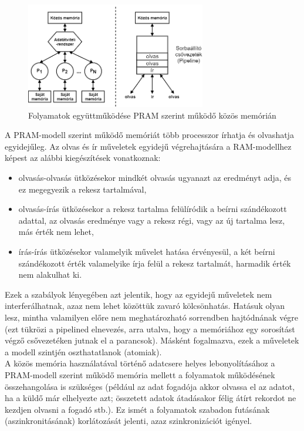 \documentclass[tikz,12pt,margin=0px]{article}
\begin{document}
    \begin{figure}[H]
        \centering
        \includegraphics[width=0.7\textwidth]{img/shared_memory_sync.png}
        \caption{Folyamatok együttműködése PRAM szerint működő közös memórián}
        \label{shared_memory_sync}
    \end{figure}
\newpage
    \noindent A PRAM-modell szerint működő memóriát több processzor írhatja és olvashatja egyidejűleg. Az olvas és ír műveletek egyidejű végrehajtására a RAM-modellhez képest az alábbi kiegészítések vonatkoznak:
    \begin{itemize}
        \item olvasás-olvasás ütközésekor mindkét olvasás ugyanazt az eredményt adja, és ez megegyezik a rekesz tartalmával,

        \item olvasás-írás ütközésekor a rekesz tartalma felülíródik a beírni szándékozott adattal, az olvasás eredménye vagy a rekesz régi, vagy az új tartalma lesz, más érték nem lehet,

        \item írás-írás ütközésekor valamelyik művelet hatása érvényesül, a két beírni szándékozott érték valamelyike írja felül a rekesz tartalmát, harmadik érték nem alakulhat ki.
    \end{itemize}

    \noindent Ezek a szabályok lényegében azt jelentik, hogy az egyidejű műveletek nem interferálhatnak, azaz nem lehet közöttük zavaró kölcsönhatás. Hatásuk olyan lesz, mintha valamilyen előre nem meghatározható sorrendben hajtódnának végre (ezt tükrözi a pipelined elnevezés, arra utalva, hogy a memóriához egy sorosítást végző csővezetéken jutnak el a parancsok). Másként fogalmazva, ezek a műveletek a modell szintjén oszthatatlanok (atomiak).\\

    \noindent A közös memória használatával történő adatcsere helyes lebonyolításához a PRAM-modell szerint működő memória mellett a folyamatok működésének összehangolása is szükséges (például az adat fogadója akkor olvassa el az adatot, ha a küldő már elhelyezte azt; összetett adatok átadásakor félig átírt rekordot ne kezdjen olvasni a fogadó stb.). Ez ismét a folyamatok szabadon futásának (aszinkronitásának) korlátozását jelenti, azaz szinkronizációt igényel.
	
\end{document}
